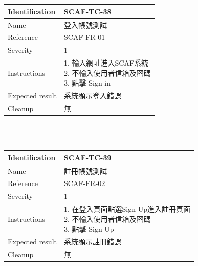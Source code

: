 \documentclass{report}
\begin{document}
\\
\newline
\\
\begin{tabularx}{\textwidth}{
  |p{}%
  |p{}|%
  }
  \hline
  \centering Identification &  SCAF-TC-38 \\
  \hline
  \centering Name & 登入帳號測試 \\
  \hline
  \centering Reference & SCAF-FR-01 \\
  \hline
  \centering Severity & 1 \\
  \hline
  \centering Instructions & 
  \makecell[l]{
    1. 輸入網址進入SCAF系統 \\
    2. 不輸入使用者信箱及密碼 \\
    3. 點擊 Sign in
  }\\
  \hline
  \centering Expected result & 系統顯示登入錯誤 \\
  \hline
  \centering Cleanup & 無 \\
  \hline
\end{tabularx}
\\
\newline
\\
\begin{tabularx}{\textwidth}{
  |p{}%
  |p{}|%
  }
  \hline
  \centering Identification &  SCAF-TC-39 \\
  \hline
  \centering Name & 註冊帳號測試 \\
  \hline
  \centering Reference & SCAF-FR-02 \\
  \hline
  \centering Severity & 1 \\
  \hline
  \centering Instructions & 
  \makecell[l]{
    1. 在登入頁面點選Sign Up進入註冊頁面 \\
    2. 不輸入使用者信箱及密碼  \\
    3. 點擊 Sign Up
  }\\
  \hline
  \centering Expected result & 系統顯示註冊錯誤 \\
  \hline
  \centering Cleanup & 無 \\
  \hline
\end{tabularx}
\\
\newline
\\
\end{document}
